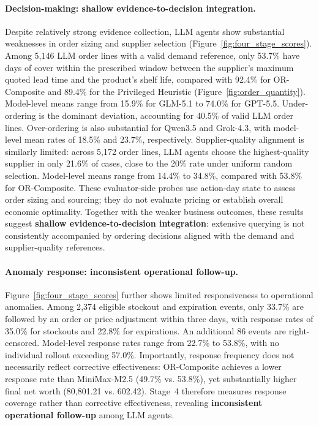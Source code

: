 \paragraph{Decision-making: shallow evidence-to-decision integration.}
Despite relatively strong evidence collection, LLM agents show substantial weaknesses in order sizing and supplier selection (Figure~\ref{fig:four_stage_scores}). Among 5{,}146 LLM order lines with a valid demand reference, only 53.7\% have days of cover within the prescribed window between the supplier's maximum quoted lead time and the product's shelf life, compared with 92.4\% for OR-Composite and 89.4\% for the Privileged Heuristic (Figure~\ref{fig:order_quantity}). Model-level means range from 15.9\% for GLM-5.1 to 74.0\% for GPT-5.5. Under-ordering is the dominant deviation, accounting for 40.5\% of valid LLM order lines. Over-ordering is also substantial for Qwen3.5 and Grok-4.3, with model-level mean rates of 18.5\% and 23.7\%, respectively. Supplier-quality alignment is similarly limited: across 5{,}172 order lines, LLM agents choose the highest-quality supplier in only 21.6\% of cases, close to the 20\% rate under uniform random selection. Model-level means range from 14.4\% to 34.8\%, compared with 53.8\% for OR-Composite. These evaluator-side probes use action-day state to assess order sizing and sourcing; they do not evaluate pricing or establish overall economic optimality. Together with the weaker business outcomes, these results suggest \textbf{shallow evidence-to-decision integration}: extensive querying is not consistently accompanied by ordering decisions aligned with the demand and supplier-quality references.

\paragraph{Anomaly response: inconsistent operational follow-up.}
Figure~\ref{fig:four_stage_scores} further shows limited
responsiveness to operational anomalies.
Among 2{,}374 eligible stockout and expiration events,
only 33.7\% are followed by an order or price adjustment
within three days, with response rates of 35.0\% for
stockouts and 22.8\% for expirations.
An additional 86 events are right-censored.
Model-level response rates range from 22.7\% to 53.8\%,
with no individual rollout exceeding 57.0\%.
Importantly, response frequency does not necessarily
reflect corrective effectiveness: OR-Composite achieves
a lower response rate than MiniMax-M2.5
(49.7\% vs. 53.8\%), yet substantially higher final
net worth (80{,}801.21 vs. 602.42).
Stage~4 therefore measures response coverage rather than
corrective effectiveness, revealing
\textbf{inconsistent operational follow-up}
among LLM agents.


